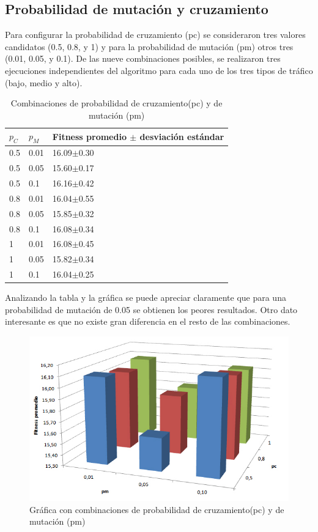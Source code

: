 \subsection{Probabilidad de mutación y cruzamiento}

Para configurar la probabilidad de cruzamiento (pc) se consideraron tres valores candidatos (0.5, 0.8, y 1) y para la probabilidad de mutación (pm) otros tres (0.01,  0.05,  y  0.1). De las nueve combinaciones posibles, se realizaron tres ejecuciones independientes del algoritmo para cada uno de los tres tipos de tráfico (bajo, medio y alto).  
 
 \begin{table}[H]
 	\renewcommand{\arraystretch}{1.2}
 	\caption{Combinaciones de probabilidad de cruzamiento(pc) y de mutación (pm)}
 	\label{table:parametro_mutacion_cruzamiento}
 	\centering
 	\begin{tabular}{p{1cm}p{1cm}p{3.5cm} }
 		\hline
 		$p_C$& 
 		$p_M$ & 
 		Fitness promedio  $\pm$ desviación estándar\\ 
 		\hline
 		0.5 & 0.01  &  16.09$\pm$0.30\\
 		0.5 & 0.05 &  15.60$\pm$0.17\\
 		0.5 & 0.1  &  16.16$\pm$0.42\\
 		0.8 & 0.01  &  16.04$\pm$0.55\\
 		0.8 & 0.05  &  15.85$\pm$0.32\\
 		0.8 & 0.1  &  16.08$\pm$0.34\\
 		1 & 0.01 &  16.08$\pm$0.45\\
 		1 & 0.05 &  15.82$\pm$0.34\\
 		1 & 0.1 &  16.04$\pm$0.25\\
 		\hline
 	\end{tabular}
 \end{table}
 
Analizando la tabla y la gráfica se puede apreciar claramente que para una probabilidad de mutación de 0.05 se obtienen los peores resultados. Otro dato interesante es que no existe gran diferencia en el resto de las combinaciones.

\begin{figure}[H]
	\centering
	\includegraphics[width=0.8\linewidth]{Figures/grafica_mutacion_cruzamiento}
	\caption{Gráfica con combinaciones de probabilidad de cruzamiento(pc) y de mutación (pm)}
	\label{fig:grafica_mutacion_cruzamiento}
\end{figure}


